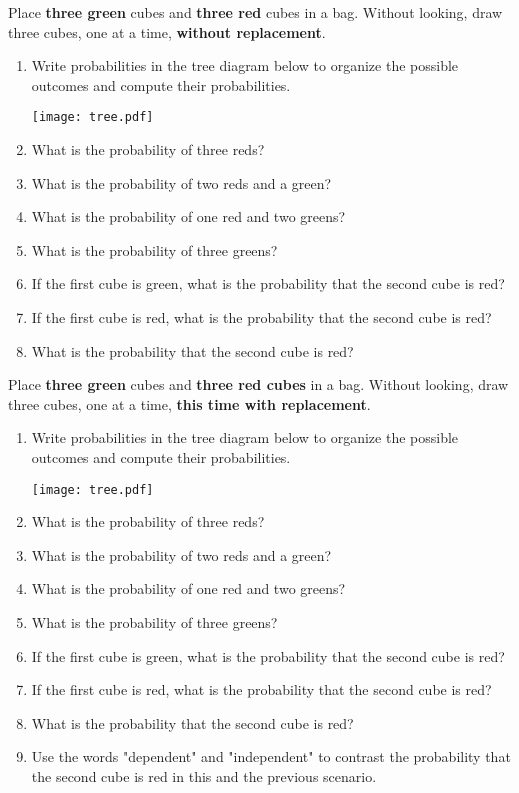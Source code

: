 \documentclass[nooutcomes]{ximera}
\begin{document}
\begin{problem}
Place \textbf{three green} cubes and \textbf{three red} cubes in a bag.  Without looking, draw three cubes, one at a time, \textbf{without replacement}.  
\begin{enumerate}
\item Write probabilities in the tree diagram below to organize the possible outcomes and compute their probabilities.  
\begin{image}
\texttt{[image: tree.pdf]}
\end{image}
\vspace{.15in}
\item What is the probability of three reds? 
\item What is the probability of two reds and a green? 
\item What is the probability of one red and two greens? 
\item What is the probability of three greens? 
\item If the first cube is green, what is the probability that the second cube is red? 
\item If the first cube is red, what is the probability that the second cube is red? 
\item What is the probability that the second cube is red?  
\end{enumerate}
\end{problem}

\newpage
\begin{problem}
Place \textbf{three green} cubes and \textbf{three red cubes} in a bag.  Without looking, draw three cubes, one at a time, \textbf{this time with replacement}.  
\begin{enumerate}
\item Write probabilities in the tree diagram below to organize the possible outcomes and compute their probabilities.  
\begin{image} 
\texttt{[image: tree.pdf]}
\end{image}
\vspace{.15in}
\item What is the probability of three reds? 
\item What is the probability of two reds and a green? 
\item What is the probability of one red and two greens? 
\item What is the probability of three greens? 
\item If the first cube is green, what is the probability that the second cube is red? 
\item If the first cube is red, what is the probability that the second cube is red? 
\item What is the probability that the second cube is red?  
\item Use the words "dependent" and "independent" to contrast the probability that the second cube is red in this and the previous scenario.  
\end{enumerate}
\end{problem}
\end{document}
